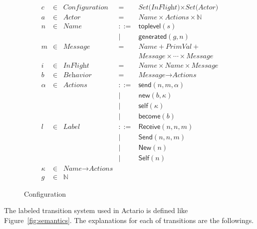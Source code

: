 \begin{figure}[t]
  \begin{displaymath}
    \begin{array}{rclcl}
      c & \in & \textit{Configuration} & =   & \textit{Set(InFlight)} \times \textit{Set(Actor)} \\
      a & \in & \textit{Actor}  & =   & \textit{Name} \times \textit{Actions} \times \mathbb{N} \\
      n & \in & \textit{Name}   & ::= & \textsf{toplevel}(s) \\
        &     &                 &   | & \textsf{generated}(g, n) \\
      m & \in & \textit{Message} & =  & \textit{Name} + \textit{PrimVal} + \\
        &     &                 &     & \textit{Message} \times \cdots \times \textit{Message} \\
      i & \in & \textit{InFlight} & = & \textit{Name} \times \textit{Name} \times \textit{Message} \\
      b & \in & \textit{Behavior} & = & \textit{Message} \rightarrow \textit{Actions} \\
      \alpha & \in & \textit{Actions} & ::= & \textsf{send}(n, m, \alpha) \\
        &     &                 &   | & \textsf{new}(b, \kappa) \\
        &     &                 &   | & \textsf{self}(\kappa) \\
        &     &                 &   | & \textsf{become}(b) \\
      l & \in & \textit{Label}  & ::= & \textsf{Receive}(n, n, m) \\
        &     &                 &   | & \textsf{Send}(n, n, m) \\
        &     &                 &   | & \textsf{New}(n) \\
        &     &                 &   | & \textsf{Self}(n) \\
      \kappa & \in & \textit{Name} \rightarrow \textit{Actions} \\
      g & \in & \mathbb{N} & &
    \end{array}
  \end{displaymath}
  \caption{Configuration}\label{fig:config}
\end{figure}

The labeled transition system used in Actario is defined like Figure~\ref{fig:semantics}.
The explanations for each of transitions are the followings.

